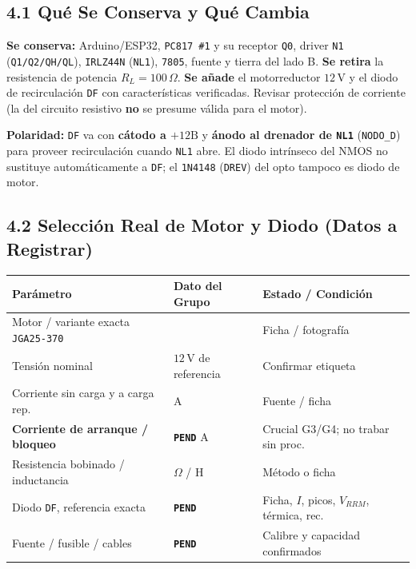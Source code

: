 \documentclass[10pt, a4paper, landscape]{article}
\begin{document}
\noindent
\begin{minipage}[t]{0.54\linewidth}
\subsection*{4.1 Qué Se Conserva y Qué Cambia}
\textbf{Se conserva:} Arduino/ESP32, \texttt{PC817 \#1} y su receptor \texttt{Q0}, driver \texttt{N1} (\texttt{Q1/Q2/QH/QL}), \texttt{IRLZ44N} (\texttt{NL1}), \texttt{7805}, fuente y tierra del lado B. \textbf{Se retira} la resistencia de potencia $R_L = 100\,\Omega$. \textbf{Se añade} el motorreductor $12\,\text{V}$ y el diodo de recirculación \texttt{DF} con características verificadas. Revisar protección de corriente (la del circuito resistivo \textbf{no} se presume válida para el motor).

\vspace{0.08cm}
\noindent\textbf{Polaridad:} \texttt{DF} va con \textbf{cátodo a $+12\text{B}$} y \textbf{ánodo al drenador de \texttt{NL1}} (\texttt{NODO\_D}) para proveer recirculación cuando \texttt{NL1} abre. El diodo intrínseco del NMOS no sustituye automáticamente a \texttt{DF}; el \texttt{1N4148} (\texttt{DREV}) del opto tampoco es diodo de motor.

\subsection*{4.2 Selección Real de Motor y Diodo (Datos a Registrar)}
\par\vspace{0.05cm}
{\footnotesize
\renewcommand{\arraystretch}{1.24}%
\noindent\begin{tabularx}{\linewidth}{|>{\raggedright\arraybackslash}p{4.8cm}|>{\raggedright\arraybackslash}p{3.4cm}|>{\raggedright\arraybackslash}X|}
\hline
\rowcolor{ucbgray}
\textbf{Parámetro} & \textbf{Dato del Grupo} & \textbf{Estado / Condición} \\ \hline
Motor / variante exacta \texttt{JGA25-370} & & Ficha / fotografía \\ \hline
Tensión nominal & $12\,\text{V}$ de referencia & Confirmar etiqueta \\ \hline
Corriente sin carga y a carga rep. & \hfill A & Fuente / ficha \\ \hline
\textbf{Corriente de arranque / bloqueo} & \textbf{\texttt{PEND}} \hfill A & Crucial G3/G4; no trabar sin proc. \\ \hline
Resistencia bobinado / inductancia & \hfill $\Omega$ / \hfill H & Método o ficha \\ \hline
Diodo \texttt{DF}, referencia exacta & \textbf{\texttt{PEND}} & Ficha, $I$, picos, $V_{RRM}$, térmica, rec. \\ \hline
Fuente / fusible / cables & \textbf{\texttt{PEND}} & Calibre y capacidad confirmados \\ \hline
\end{tabularx}\par}
\end{minipage}\hfill
\end{document}
